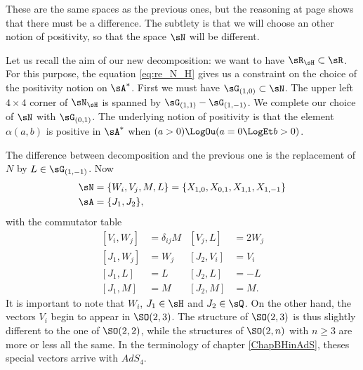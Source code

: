 These are the same spaces as the previous ones, but the reasoning at page \pageref{pg:subt_tilde} shows that there must be a difference. The subtlety is that we will choose an other notion of positivity, so that the space $\sN$ will be different. 


\newcommand{\CaptionFigHNxitLj}{The root space}

 
Let us recall the aim of our new decomposition: we want to have $\sR_{\sH}\subset\sR$. For this purpose, the equation \eqref{eq:re_N_H} gives us a constraint on the choice of the positivity notion on $\sA^*$. First we must have $\sG_{(1,0)}\subset\sN$. The upper left $4\times 4$ corner of $\sN_{\sH}$ is spanned by $\sG_{(1,1)}-\sG_{(1,-1)}$. We complete our choice of $\sN$ with $\sG_{(0,1)}$. The underlying notion of positivity is that the element $\alpha(a,b)$ is positive in $\sA^*$ when $ (a>0) \LogOu(a=0 \LogEt b>0)$. 

The difference between decomposition and the previous one is the replacement of $N$ by $L\in\sG_{(1,-1)}$. Now\label{PgTablaIwa}
\begin{subequations}		\label{EqLeANEnDimAlg}
\begin{align}
	\sN&=\{W_i,V_j,M,L\}=\{ X_{1,0},X_{0,1},X_{1,1},X_{1,-1} \}\\
\sA&=\{ J_1, J_2\},
\end{align}
\end{subequations}
with the commutator table 
\begin{subequations}  \label{EqTableSOIwa}
\begin{align}
[V_i,W_j]&=\delta_{ij}M &[V_j,L]&=2W_j\\
[ J_1,W_j]&=W_j       &[ J_2,V_i]&=V_i\\
[ J_1,L]&=L           &[ J_2,L]&=-L\\
[ J_1,M]&=M           &[ J_2,M]&=M.
\end{align}
\end{subequations}
It is important to note that $W_{i}$, $J_{1}\in\sH$ and $J_{2}\in\sQ$. On the other hand, the vectors $V_i$ begin to appear in $\SO(2,3)$. The structure of $\SO(2,3)$ is thus slightly different to the one of $\SO(2,2)$, while the structures of $\SO(2,n)$ with $n\geq 3$ are more or less all the same. In the terminology of chapter \ref{ChapBHinAdS}, theses special vectors arrive with $AdS_4$.

